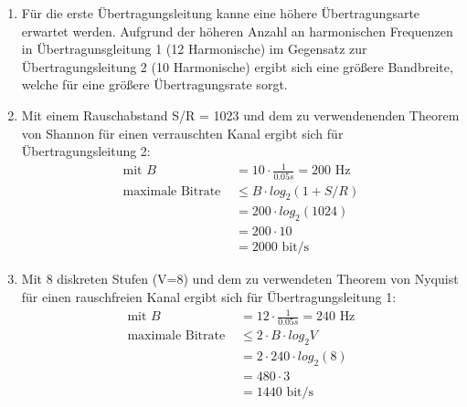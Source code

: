 \documentclass[12pt]{scrartcl}
\begin{document}
\setcounter{exnum}{3}
    \begin{enumerate}[label=(\alph*)]
        \item   Für die erste Übertragungsleitung kanne eine höhere Übertragungsarte erwartet werden. Aufgrund der höheren Anzahl an harmonischen
                Frequenzen in Übertragunsgleitung 1 (12 Harmonische) im Gegensatz zur Übertragungsleitung 2 (10 Harmonische) ergibt sich eine größere Bandbreite,
                welche für eine größere Übertragungsrate sorgt.
        \item   Mit einem Rauschabstand S/R = 1023 und dem zu verwendenenden Theorem von Shannon für einen verrauschten Kanal ergibt sich 
                für Übertragungsleitung 2: 
            \begin{align*}
                \text{mit } B &= 10 \cdot \frac{1}{0.05 s} = 200 \text{ Hz} \\
                \text{maximale Bitrate } &\leq B \cdot log_{2} (1+ S/R) \\
                &= 200 \cdot log_{2}(1024) \\
                &= 200 \cdot 10 \\
                &= 2000 \text{ bit/s}
            \end{align*}
        \item Mit 8 diskreten Stufen (V=8) und dem zu verwendeten Theorem von Nyquist für einen rauschfreien Kanal ergibt sich für Übertragungsleitung 1: 
            \begin{align*}
                \text{mit } B &= 12 \cdot \frac{1}{0.05 s} = 240 \text{ Hz}\\
                \text{maximale Bitrate } &\leq 2 \cdot B \cdot log_{2} V \\
                &= 2 \cdot 240 \cdot log_{2}(8) \\
                &= 480 \cdot 3 \\
                &= 1440 \text{ bit/s}\\
            \end{align*}
    \end{enumerate}
\end{document}
